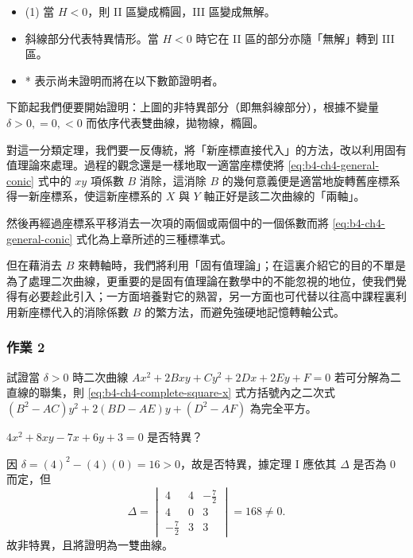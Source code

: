 \begin{itemize}
  \item[\textbf{註明}] (1) 當 $H < 0$，則 II 區變成橢圓，III 區變成無解。
  \item[(2)] 斜線部分代表特異情形。當 $H < 0$ 時它在 II 區的部分亦隨「無解」轉到 III 區。
  \item[(3)] * 表示尚未證明而將在以下數節證明者。
\end{itemize}

下節起我們便要開始證明：上圖的非特異部分（即無斜線部分），根據不變量 $\delta > 0, = 0, < 0$ 而依序代表雙曲線，拋物線，橢圓。

對這一分類定理，我們要一反傳統，將「新座標直接代入」的方法，改以利用固有值理論來處理。過程的觀念還是一樣地取一適當座標使將 \eqref{eq:b4-ch4-general-conic} 式中的 $xy$ 項係數 $B$ 消除，這消除 $B$ 的幾何意義便是適當地旋轉舊座標系得一新座標系，使這新座標系的 $X$ 與 $Y$ 軸正好是該二次曲線的「兩軸」。

然後再經過座標系平移消去一次項的兩個或兩個中的一個係數而將 \eqref{eq:b4-ch4-general-conic} 式化為上章所述的三種標準式。

但在藉消去 $B$ 來轉軸時，我們將利用「固有值理論」；在這裏介紹它的目的不單是為了處理二次曲線，更重要的是固有值理論在數學中的不能忽視的地位，使我們覺得有必要趁此引入；一方面培養對它的熟習，另一方面也可代替以往高中課程裏利用新座標代入的消除係數 $B$ 的繁方法，而避免強硬地記憶轉軸公式。

\subsubsection*{作業 2}
試證當 $\delta > 0$ 時二次曲線 $Ax^2 + 2Bxy + Cy^2 + 2Dx + 2Ey + F = 0$ 若可分解為二直線的聯集，則 \eqref{eq:b4-ch4-complete-square-x} 式方括號內之二次式 $(B^2 - AC)y^2 + 2(BD - AE)y + (D^2 - AF)$ 為完全平方。

\begin{example}
$4x^2 + 8xy - 7x + 6y + 3 = 0$ 是否特異？
\end{example}

\begin{solution}
因 $\delta = (4)^2 - (4)(0) = 16 > 0$，故是否特異，據定理 I 應依其 $\Delta$ 是否為 0 而定，但
\[
\Delta = \begin{vmatrix} 4 & 4 & -\frac{7}{2} \\ 4 & 0 & 3 \\ -\frac{7}{2} & 3 & 3 \end{vmatrix} = 168 \ne 0.
\]
故非特異，且將證明為一雙曲線。
\end{solution}

